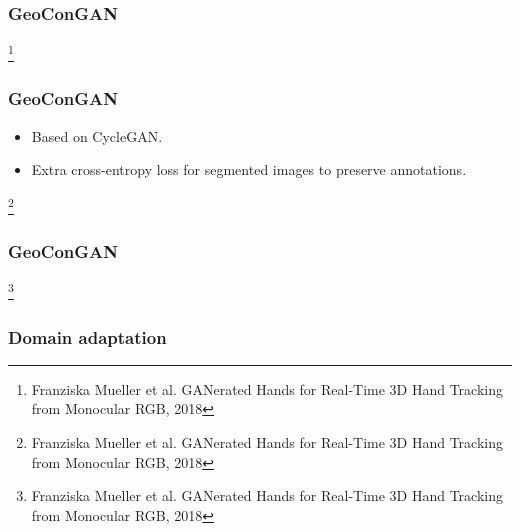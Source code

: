 \documentclass[14pt,aspectratio=169]{beamer}
\newcommand\blfootnote[1]{%
  \begingroup
  \renewcommand\thefootnote{}\footnote{#1}%
  \addtocounter{footnote}{-1}%
  \endgroup
}
\begin{document}
\begin{frame}
\frametitle{GeoConGAN}
\blfootnote{Franziska Mueller et al. GANerated Hands for Real-Time 3D Hand Tracking from Monocular RGB, 2018}
\end{frame}

\begin{frame}
\frametitle{GeoConGAN}
\begin{itemize}
  \item Based on CycleGAN.
  \item Extra cross-entropy loss for segmented images to preserve annotations.
\end{itemize}
\blfootnote{Franziska Mueller et al. GANerated Hands for Real-Time 3D Hand Tracking from Monocular RGB, 2018}
\end{frame}

\begin{frame}
\frametitle{GeoConGAN}
\blfootnote{Franziska Mueller et al. GANerated Hands for Real-Time 3D Hand Tracking from Monocular RGB, 2018}
\end{frame}

\begin{frame}
\frametitle{Domain adaptation}
\end{frame}
\end{document}
